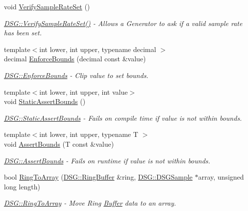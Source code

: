 \begin{DoxyCompactItemize}
void \hyperlink{namespace_d_s_g_a0749755eb0ed01894adc60fab768dfa5}{Verify\+Sample\+Rate\+Set} ()
\begin{DoxyCompactList}\small\item\em \hyperlink{namespace_d_s_g_a0749755eb0ed01894adc60fab768dfa5}{D\+S\+G\+::\+Verify\+Sample\+Rate\+Set()} -\/ Allows a Generator to ask if a valid sample rate has been set. \end{DoxyCompactList}\item 
{\footnotesize template$<$int lower, int upper, typename decimal $>$ }\\decimal \hyperlink{namespace_d_s_g_a8bc6af8f213f4f713bd634ec8545491c}{Enforce\+Bounds} (decimal const \&value)
\begin{DoxyCompactList}\small\item\em \hyperlink{namespace_d_s_g_a8bc6af8f213f4f713bd634ec8545491c}{D\+S\+G\+::\+Enforce\+Bounds} -\/ Clip value to set bounds. \end{DoxyCompactList}\item 
{\footnotesize template$<$int lower, int upper, int value$>$ }\\void \hyperlink{namespace_d_s_g_a3fa12557d889e704f2e33d88929ec67a}{Static\+Assert\+Bounds} ()
\begin{DoxyCompactList}\small\item\em \hyperlink{namespace_d_s_g_a3fa12557d889e704f2e33d88929ec67a}{D\+S\+G\+::\+Static\+Assert\+Bounds} -\/ Fails on compile time if value is not within bounds. \end{DoxyCompactList}\item 
{\footnotesize template$<$int lower, int upper, typename T $>$ }\\void \hyperlink{namespace_d_s_g_a386b0133be9f4c7cb1ba014170ce294d}{Assert\+Bounds} (T const \&value)
\begin{DoxyCompactList}\small\item\em \hyperlink{namespace_d_s_g_a386b0133be9f4c7cb1ba014170ce294d}{D\+S\+G\+::\+Assert\+Bounds} -\/ Fails on runtime if value is not within bounds. \end{DoxyCompactList}\item 
bool \hyperlink{namespace_d_s_g_a4049a445d7cb9ee4f9140bdfdbd5e11c}{Ring\+To\+Array} (\hyperlink{class_d_s_g_1_1_ring_buffer}{D\+S\+G\+::\+Ring\+Buffer} \&ring, \hyperlink{namespace_d_s_g_ac39a94cd27ebcd9c1e7502d0c624894a}{D\+S\+G\+::\+D\+S\+G\+Sample} $\ast$array, unsigned long length)
\begin{DoxyCompactList}\small\item\em \hyperlink{namespace_d_s_g_a4049a445d7cb9ee4f9140bdfdbd5e11c}{D\+S\+G\+::\+Ring\+To\+Array} -\/ Move Ring \hyperlink{class_d_s_g_1_1_buffer}{Buffer} data to an array. \end{DoxyCompactList}\item 

\end{DoxyCompactItemize}
